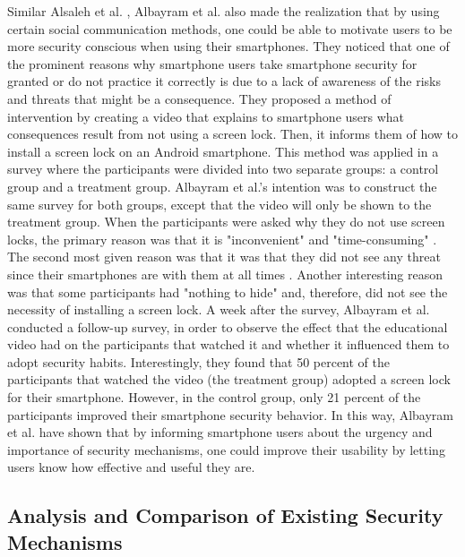 Similar Alsaleh et al. \cite{Alsaleh}, Albayram et al. \cite{Albayram:2017:BUL:3235924.3235929} also made the realization that by using certain social communication methods, one could be able to motivate users to be more security conscious when using their smartphones. They noticed that one of the prominent reasons why smartphone users take smartphone security for granted or do not practice it correctly is due to a lack of awareness of the risks and threats that might be a consequence. They proposed a method of intervention by creating a video that explains to smartphone users what consequences result from not using a screen lock. Then, it informs them of how to install a screen lock on an Android smartphone. This method was applied in a survey where the participants were divided into two separate groups: a control group and a treatment group. Albayram et al.'s \cite{Albayram:2017:BUL:3235924.3235929} intention was to construct the same survey for both groups, except that the video will only be shown to the treatment group. When the participants were asked why they do not use screen locks, the primary reason was that it is "inconvenient" and "time-consuming" \cite{Albayram:2017:BUL:3235924.3235929}. The second most given reason was that it was that they did not see any threat since their smartphones are with them at all times \cite{Albayram:2017:BUL:3235924.3235929}. Another interesting reason was that some participants had "nothing to hide" and, therefore, did not see the necessity of installing a screen lock. A week after the survey, Albayram et al. \cite{Albayram:2017:BUL:3235924.3235929} conducted a follow-up survey, in order to observe the effect that the educational video had on the participants that watched it and whether it influenced them to adopt security habits.
Interestingly, they found that 50 percent of the participants that watched the video (the treatment group) adopted a screen lock for their smartphone. However, in the control group, only 21 percent of the participants improved their smartphone security behavior. In this way, Albayram et al. \cite{Albayram:2017:BUL:3235924.3235929} have shown that by informing smartphone users about the urgency and importance of security mechanisms, one could improve their usability by letting users know how effective and useful they are. 

\subsection{Analysis and Comparison of Existing Security Mechanisms}



